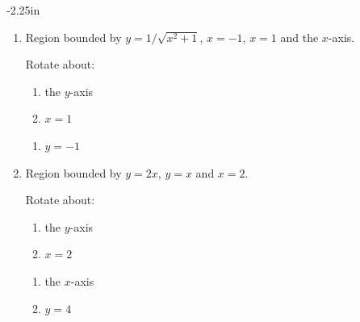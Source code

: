\begin{adjustwidth*}{}{-2.25in}
\begin{multicols*}{2}
\begin{enumerate}[1),resume]
\item Region bounded by $y=1/\sqrt{x^2+1}$, $x=-1$, $x=1$ and the $x$-axis.

Rotate about:

\noindent%
\begin{minipage}[t]{.5\linewidth}
\begin{enumerate}
\item		the $y$-axis
\item		$x=1$
\end{enumerate}
\end{minipage}
\begin{minipage}[t]{.5\linewidth}
\begin{enumerate}\addtocounter{enumii}{2}
\item		$y=-1$
\end{enumerate}
\end{minipage}

\item Region bounded by $y=2x$, $y=x$ and $x=2$.

Rotate about:

\noindent%
\begin{minipage}[t]{.5\linewidth}
\begin{enumerate}
\item		the $y$-axis
\item		$x=2$
\end{enumerate}
\end{minipage}
\begin{minipage}[t]{.5\linewidth}
\begin{enumerate}\addtocounter{enumii}{2}
\item		the $x$-axis
\item		$y=4$
\end{enumerate}
\end{minipage}

\end{enumerate}

\end{multicols*}
\end{adjustwidth*}

\afterexercises